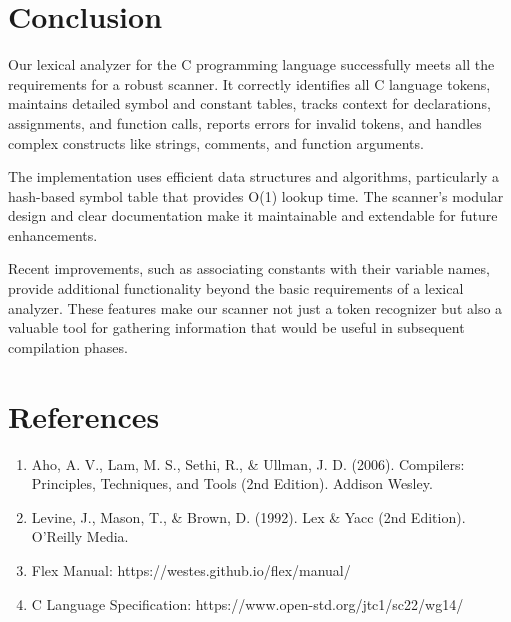 \documentclass[12pt]{article}
\begin{document}
\section{Conclusion}

Our lexical analyzer for the C programming language successfully meets all the requirements for a robust scanner. It correctly identifies all C language tokens, maintains detailed symbol and constant tables, tracks context for declarations, assignments, and function calls, reports errors for invalid tokens, and handles complex constructs like strings, comments, and function arguments.

The implementation uses efficient data structures and algorithms, particularly a hash-based symbol table that provides O(1) lookup time. The scanner's modular design and clear documentation make it maintainable and extendable for future enhancements.

Recent improvements, such as associating constants with their variable names, provide additional functionality beyond the basic requirements of a lexical analyzer. These features make our scanner not just a token recognizer but also a valuable tool for gathering information that would be useful in subsequent compilation phases.

\section{References}

\begin{enumerate}
    \item Aho, A. V., Lam, M. S., Sethi, R., \& Ullman, J. D. (2006). Compilers: Principles, Techniques, and Tools (2nd Edition). Addison Wesley.
    \item Levine, J., Mason, T., \& Brown, D. (1992). Lex \& Yacc (2nd Edition). O'Reilly Media.
    \item Flex Manual: https://westes.github.io/flex/manual/
    \item C Language Specification: https://www.open-std.org/jtc1/sc22/wg14/
\end{enumerate}
   
    
\end{document}
